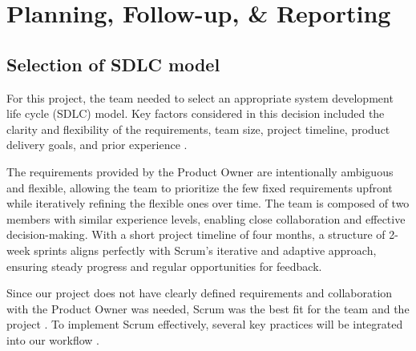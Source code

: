 \section{Planning, Follow-up, \& Reporting}
\subsection{Selection of SDLC model}

\begin{comment}
    Describe how the group will follow the chosen model
    
    Fire viktige forhold å ta hensyn til ved valg av utviklingmodell /
    prosessrammeverk :
    ▪ Universitetets krav til prosjektarbeidet/bacheloroppgaven
    ▪ Karakteristika ved oppgaven
    ▪ Motivasjonen og ferdighetene til deltagerne
    ▪ Ønsker og krav fra oppdragsgiver
    Velg modell – deretter bør dere tilpasse den / sette den opp til deres
    “setting”.


\end{comment}

For this project, the team needed to select an appropriate system development life cycle (SDLC) model. Key factors considered in this decision included the clarity and flexibility of the requirements, team size, project timeline, product delivery goals, and prior experience \cite{sdlc_model}. 

The requirements provided by the Product Owner are intentionally ambiguous and flexible, allowing the team to prioritize the few fixed requirements upfront while iteratively refining the flexible ones over time. The team is composed of two members with similar experience levels, enabling close collaboration and effective decision-making. With a short project timeline of four months, a structure of 2-week sprints aligns perfectly with Scrum's iterative and adaptive approach, ensuring steady progress and regular opportunities for feedback. 

Since our project does not have clearly defined requirements and collaboration with the Product Owner was needed, Scrum was the best fit for the team and the project \cite{sdlc_model}. To implement Scrum effectively, several key practices will be integrated into our workflow \cite{scrum_guide}.

